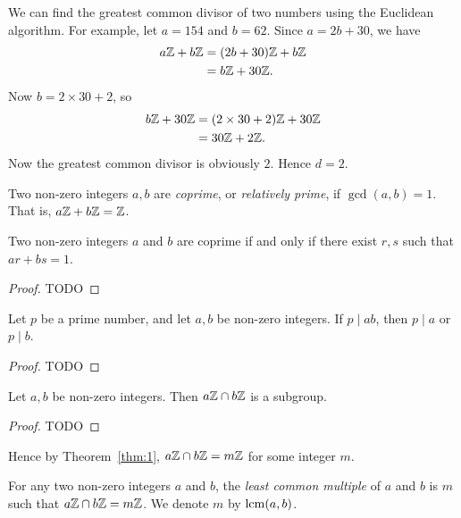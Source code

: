 \begin{example}
  We can find the greatest common divisor of two numbers using the Euclidean algorithm. For example, let $a = 154$ and  $b = 62$. Since $a = 2b + 30$, we have 
  \begin{align*}
    a\mathbb{Z} + b\mathbb{Z} &= (2b + 30)\mathbb{Z} + b\mathbb{Z} \\
              &= b\mathbb{Z} + 30\mathbb{Z}.
  \end{align*}
  Now $b = 2\times 30 + 2$, so 
  \begin{align*}
    b\mathbb{Z} + 30\mathbb{Z} &= (2\times 30 + 2)\mathbb{Z} + 30\mathbb{Z} \\
               &= 30\mathbb{Z} + 2\mathbb{Z}.
  \end{align*}
  Now the greatest common divisor is obviously $2$. Hence $d = 2$.
\end{example}

\begin{definition}
  Two non-zero integers $a, b$ are \emph{coprime}, or \emph{relatively prime}, if $\gcd(a, b) = 1$. That is, $a\mathbb{Z} + b\mathbb{Z} = \mathbb{Z}$.
\end{definition}

\begin{proposition}
  Two non-zero integers $a$ and $b$ are coprime if and only if there exist $r, s$ such that $ar + bs = 1$.
\end{proposition}
\begin{proof}
  TODO
\end{proof}

\begin{proposition}
  Let $p$ be a prime number, and let $a, b$ be non-zero integers. If $p \mid ab$, then $p \mid a$ or $p \mid b$.
\end{proposition}
\begin{proof}
  TODO
\end{proof}

\begin{proposition}
  Let $a, b$ be non-zero integers. Then $a\mathbb{Z} \cap b\mathbb{Z}$ is a subgroup.
\end{proposition}
\begin{proof}
  TODO
\end{proof}

Hence by Theorem~\ref{thm:1}, $a\mathbb{Z} \cap b\mathbb{Z} = m\mathbb{Z}$ for some integer $m$.

\begin{definition}
  For any two non-zero integers $a$ and $b$, the \emph{least common multiple} of $a$ and $b$ is $m$ such that $a\mathbb{Z} \cap b\mathbb{Z} = m\mathbb{Z}$. We denote $m$ by $\operatorname{lcm}(a, b)$.
\end{definition}

